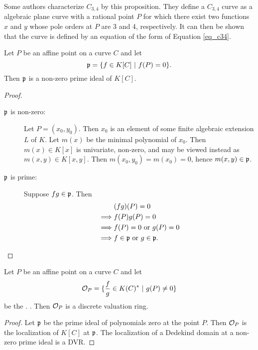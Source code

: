 Some authors  characterize $C_{3,4}$ by this proposition.
They define a $C_{3,4}$ curve as a  algebraic plane curve
with a rational point $P$
for which there exist two functions $x$ and $y$ whose pole orders at $P$ are 3 and 4, respectively.
It can then be shown that the curve is defined by an equation of the form of Equation \ref{eq_c34}.

\begin{proposition}
  Let $P$ be an affine point on a curve $C$ and let
  \[ \frak p = \{ f \in K[C] ~|~ f(P) = 0 \}. \]
  Then $\frak p$ is a non-zero prime ideal of $K[C]$.
\end{proposition}
\begin{proof}
  \begin{description}
    \item[$\frak p$ is non-zero:]
      Let $P = (x_0, y_0)$.
      Then $x_0$ is an element of some finite algebraic extension $L$ of $K$.
      Let $m(x)$ be the minimal polynomial of $x_0$.
      Then $m(x) \in K[x]$ is univariate, non-zero, and may be viewed instead as $m(x,y) \in K[x,y]$.
      Then $m(x_0, y_0) = m(x_0) = 0$, hence $m(x,y) \in \frak p$.
    \item[$\frak p$ is prime:]
      Suppose $fg \in \frak p$. Then
      \begin{align*}
        & (fg)(P) = 0 \\
        \implies & f(P)g(P) = 0 \\
        \implies & f(P) = 0 \text{ or } g(P) = 0 \\
        \implies & f \in \frak p \text{ or } g \in \frak p.
      \end{align*}
  \end{description}
\end{proof}

\begin{proposition}
  Let $P$ be an affine point on a curve $C$ and let
  \[ \cal O_P = \{ \frac f g \in K(C)^* ~|~ g(P) \neq 0 \} \]
  be the .
  .
  Then $\cal O_P$ is a discrete valuation ring.
\end{proposition}
\begin{proof}
  Let $\frak p$ be the prime ideal of polynomials zero at the point $P$.
  Then $\cal O_P$ is the localization of $K[C]$ at $\frak p$.
  The localization of a Dedekind domain at a non-zero prime ideal is a DVR.
\end{proof}

